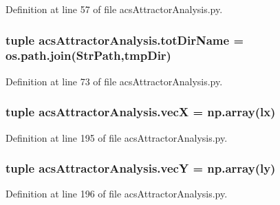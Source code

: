 Definition at line 57 of file acs\+Attractor\+Analysis.\+py.

\hypertarget{a00124_ad3caf9c42727aaab24f4ea4dae362fc9}{
\subsubsection[{tot\+Dir\+Name}]{\setlength{\rightskip}{0pt plus 5cm}tuple acs\+Attractor\+Analysis.\+tot\+Dir\+Name = os.\+path.\+join({\bf Str\+Path},tmp\+Dir)}}\label{a00124_ad3caf9c42727aaab24f4ea4dae362fc9}


Definition at line 73 of file acs\+Attractor\+Analysis.\+py.

\hypertarget{a00124_af20e9c92b7d977049b881882c0d1382c}{
\subsubsection[{vec\+X}]{\setlength{\rightskip}{0pt plus 5cm}tuple acs\+Attractor\+Analysis.\+vec\+X = np.\+array(lx)}}\label{a00124_af20e9c92b7d977049b881882c0d1382c}


Definition at line 195 of file acs\+Attractor\+Analysis.\+py.

\hypertarget{a00124_a691fb5bd87af2162b5acaf48ea4c06e7}{
\subsubsection[{vec\+Y}]{\setlength{\rightskip}{0pt plus 5cm}tuple acs\+Attractor\+Analysis.\+vec\+Y = np.\+array(ly)}}\label{a00124_a691fb5bd87af2162b5acaf48ea4c06e7}


Definition at line 196 of file acs\+Attractor\+Analysis.\+py.

